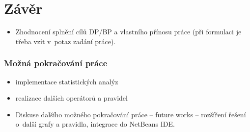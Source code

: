 \chapter{Závěr}

\begin{itemize}
\item Zhodnocení splnění cílů DP/BP a  vlastního přínosu práce (při formulaci je třeba vzít v~potaz zadání práce).
\end{itemize}

\subsection*{Možná pokračování práce}
\begin{itemize}
\item implementace statistických analýz
\item realizace dalších operátorů a pravidel
\item Diskuse dalšího možného pokračování práce -- future works -- rozšíření řešení o~další grafy a pravidla, integrace do NetBeans IDE.
\end{itemize}
